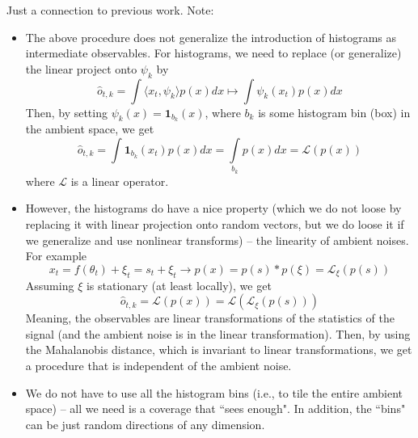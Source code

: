 \documentclass[12pt]{article}
\begin{document}
Just a connection to previous work. Note:
\begin{itemize}
	
	\item
	The above procedure does not generalize the introduction of histograms as intermediate observables. For histograms, we need to replace (or generalize) the linear project onto $\psi_k$ by
	\[
		\hat{o}_{t,k} = \int \langle x _t , \psi _k \rangle p(x) dx \mapsto \int \psi_k( x _t) p(x) dx
	\]
	Then, by setting $\psi _k (x) = \mathbf{1}_{b_k} (x) $, where $b_k$ is some histogram bin (box) in the ambient space, we get
	\[
		\hat{o}_{t,k} = \int \mathbf{1} _{b_k} ( x _t) p(x) dx = \int \limits _{b_k} p(x) dx = \mathcal{L} (p(x))
	\]
	where $\mathcal{L}$ is a linear operator.
	
	\item
	However, the histograms do have a nice property (which we do not loose by replacing it with linear projection onto random vectors, but we do loose it if we generalize and use nonlinear transforms) -- the linearity of ambient noises. For example
	\[
		x_t = f(\theta _t ) + \xi _t = s_t + \xi_t \rightarrow p(x) = p(s)*p(\xi) = \mathcal{L}_{\xi} (p(s))
	\]
	Assuming $\xi$ is stationary (at least locally), we get
	\[
		\hat{o}_{t,k} = \mathcal{L} (p(x)) = \mathcal{L} ( \mathcal{L}_{\xi} (p(s)))
	\]
	Meaning, the observables are linear transformations of the statistics of the signal (and the ambient noise is in the linear transformation). Then, by using the Mahalanobis distance, which is invariant to linear transformations, we get a procedure that is independent of the ambient noise.
	
	\item
	We do not have to use all the histogram bins (i.e., to tile the entire ambient  space) -- all we need is a coverage that ``sees enough". In addition, the ``bins" can be just random directions of any dimension.
	
	 
\end{itemize}
\end{document}
